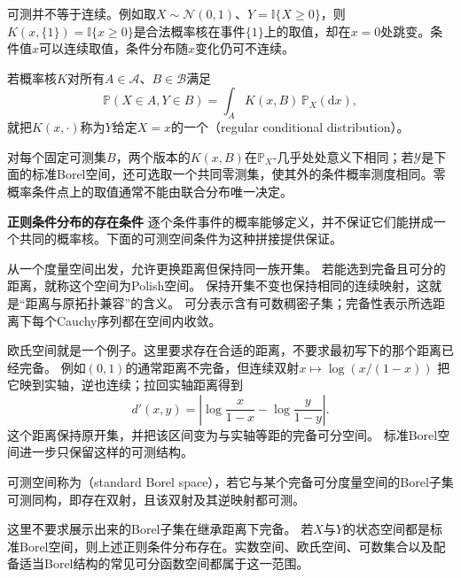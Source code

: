 可测并不等于连续。例如取\(X\sim\mathcal N(0,1)\)、\(Y=\mathbb I\{X\geq0\}\)，则\(K(x,\{1\})=\mathbb I\{x\geq0\}\)是合法概率核在事件\(\{1\}\)上的取值，却在\(x=0\)处跳变。条件值\(x\)可以连续取值，条件分布随\(x\)变化仍可不连续。

\begin{definition}[正则条件分布]
  \label{def:probability-regular-conditional-distribution}
若概率核\(K\)对所有\(A\in\mathcal A\)、\(B\in\mathcal B\)满足
\begin{equation}
  \mathbb{P}(X\in A,Y\in B)
  =
  \int_A K(x,B)\,\mathbb{P}_X(\mathrm{d}x),
  \label{eq:probability-regular-conditional-kernel}
\end{equation}
就把\(K(x,\cdot)\)称为\(Y\)给定\(X=x\)的一个（regular conditional distribution）。
\end{definition}
对每个固定可测集\(B\)，两个版本的\(K(x,B)\)在\(\mathbb P_X\)-几乎处处意义下相同；若\(\mathcal Y\)是下面的标准Borel空间，还可选取一个共同零测集，使其外的条件概率测度相同。零概率条件点上的取值通常不能由联合分布唯一决定。

\par\medskip\noindent\textbf{正则条件分布的存在条件}\quad
逐个条件事件的概率能够定义，并不保证它们能拼成一个共同的概率核。下面的可测空间条件为这种拼接提供保证。
\begin{definition}[Polish空间]
  \label{def:probability-polish-space}
从一个度量空间出发，允许更换距离但保持同一族开集。
若能选到完备且可分的距离，就称这个空间为Polish空间。
保持开集不变也保持相同的连续映射，这就是“距离与原拓扑兼容”的含义。
可分表示含有可数稠密子集；完备性表示所选距离下每个Cauchy序列都在空间内收敛。
\end{definition}
欧氏空间就是一个例子。这里要求存在合适的距离，不要求最初写下的那个距离已经完备。
例如\((0,1)\)的通常距离不完备，但连续双射\(x\mapsto\log(x/(1-x))\)
把它映到实轴，逆也连续；拉回实轴距离得到
\[
 d'(x,y)=\left|\log\frac{x}{1-x}-\log\frac{y}{1-y}\right|.
\]
这个距离保持原开集，并把该区间变为与实轴等距的完备可分空间。
标准Borel空间进一步只保留这样的可测结构。
\begin{definition}[标准Borel空间]
  \label{def:probability-standard-borel-space}
  可测空间称为（standard Borel space），若它与某个完备可分度量空间的Borel子集可测同构，即存在双射，且该双射及其逆映射都可测。
\end{definition}
这里不要求展示出来的Borel子集在继承距离下完备。
若\(X\)与\(Y\)的状态空间都是标准Borel空间，则上述正则条件分布存在。实数空间、欧氏空间、可数集合以及配备适当Borel结构的常见可分函数空间都属于这一范围。

